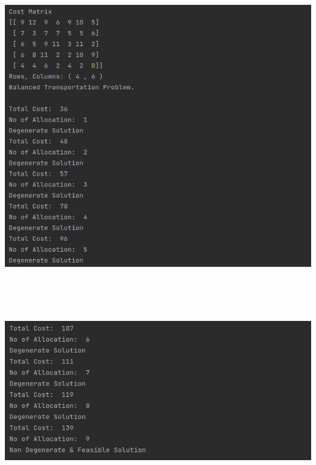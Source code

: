 \documentclass[12pt, letterpaper, twoside]{book}
\begin{document}
\includegraphics[height=400pt,width=550pt]{Output2}

\includegraphics[height=200pt,width=550pt]{Output3}
\end{document}
